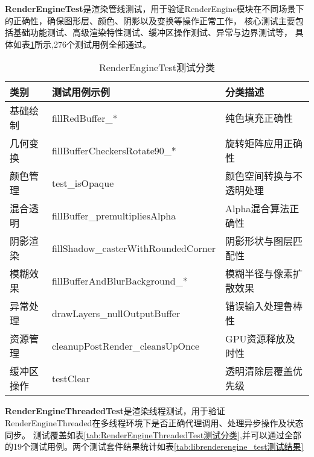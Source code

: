 \textbf{RenderEngineTest}是渲染管线测试，用于验证RenderEngine模块在不同场景下的正确性，确保图形层、颜色、阴影以及变换等操作正常工作，
核心测试主要包括基础功能测试、高级渲染特性测试、缓冲区操作测试、异常与边界测试等，
具体如表\ref{tab:RenderEngineTest测试分类}所示,276个测试用例全部通过。
    \begin{table}[h]
        \centering
        \caption{RenderEngineTest测试分类}
        \label{tab:RenderEngineTest测试分类}
        \begin{tabular}{lll}
          \toprule
          类别 & 测试用例示例 & 分类描述 \\
          \midrule
            基础绘制 & fillRedBuffer\_* & 纯色填充正确性 \\
            几何变换 & fillBufferCheckersRotate90\_* & 旋转矩阵应用正确性 \\
            颜色管理 & test\_isOpaque & 颜色空间转换与不透明处理 \\
            混合透明 & fillBuffer\_premultipliesAlpha & Alpha混合算法正确性 \\
            阴影渲染 & fillShadow\_casterWithRoundedCorner & 阴影形状与图层匹配性 \\
            模糊效果 & fillBufferAndBlurBackground\_* & 模糊半径与像素扩散效果 \\
            异常处理 & drawLayers\_nullOutputBuffer & 错误输入处理鲁棒性 \\
            资源管理 & cleanupPostRender\_cleansUpOnce & GPU资源释放及时性 \\
            缓冲区操作 & testClear & 透明清除层覆盖优先级 \\
          \bottomrule
        \end{tabular}
        \note{}
    \end{table}

\textbf{RenderEngineThreadedTest}是渲染线程测试，用于验证RenderEngineThreaded在多线程环境下是否正确代理调用、处理异步操作及状态同步。
测试覆盖如表\ref{tab:RenderEngineThreadedTest测试分类},并可以通过全部的19个测试用例。两个测试套件结果统计如表\ref{tab:librenderengine_test测试结果}

